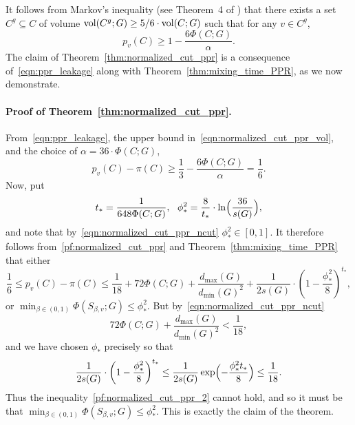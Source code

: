 It follows from Markov's inequality (see Theorem~4 of \cite{andersen2006}) that there exists a set $C^g \subseteq C$ of volume $\mathrm{vol}(C^g;G) \geq 5/6 \cdot \mathrm{vol}(C;G)$ such that for any $v \in C^g$,
\begin{equation}
\label{eqn:ppr_leakage}
p_v(C) \geq 1 - \frac{6\Phi(C;G)}{\alpha}.
\end{equation}
The claim of Theorem~\ref{thm:normalized_cut_ppr} is a consequence of~\eqref{eqn:ppr_leakage} along with Theorem~\ref{thm:mixing_time_PPR}, as we now demonstrate.
\paragraph{Proof of Theorem~\ref{thm:normalized_cut_ppr}.}
	From~\eqref{eqn:ppr_leakage}, the upper bound in~\eqref{eqn:normalized_cut_ppr_vol}, and the choice of $\alpha = 36 \cdot \Phi(C;G)$, 
	\begin{equation}
	\label{pf:normalized_cut_ppr}
	p_v(C) - \pi(C) \geq \frac{1}{3} - \frac{6 \Phi(C;G)}{\alpha} = \frac{1}{6}.
	\end{equation}
	Now, put 
	\begin{equation*}
	t_{\ast} = \frac{1}{648 \Phi(C;G)},~~\phi_{\ast}^2 = \frac{8}{t_{\ast}} \cdot \ln\Bigl(\frac{36}{s(G)}\Bigr),
	\end{equation*}
	and note that by~\eqref{eqn:normalized_cut_ppr_ncut} $\phi_{\ast}^2 \in [0,1]$. It therefore follows from~\eqref{pf:normalized_cut_ppr} and Theorem~\ref{thm:mixing_time_PPR} that either
	\begin{equation}
	\label{pf:normalized_cut_ppr_2}
	\frac{1}{6} \leq p_v(C) - \pi(C) \leq \frac{1}{18} + 72 \Phi(C;G) + \frac{d_{\max}(G)}{d_{\min}(G)^2} + \frac{1}{2s(G)} \cdot \left(1 - \frac{\phi_{\ast}^2}{8}\right)^{t_{\ast}},
	\end{equation}
	or $\min_{\beta \in (0,1)} \Phi(S_{\beta,v};G) \leq \phi_{\ast}^2$. But by~\eqref{eqn:normalized_cut_ppr_ncut}
	\begin{equation*}
	72 \Phi(C;G) + \frac{d_{\max}(G)}{d_{\min}(G)^2} < \frac{1}{18},
	\end{equation*}
	and we have chosen $\phi_{\ast}$ precisely so that
	\begin{equation*}
	\frac{1}{2s(G)} \cdot \left(1 - \frac{\phi_{\ast}^2}{8}\right)^{t_{\ast}} \leq \frac{1}{2s(G)} \exp\Bigl(-\frac{\phi_{\ast}^2 t_{\ast}}{8}\Bigr) \leq \frac{1}{18}.
	\end{equation*}
	Thus the inequality~\eqref{pf:normalized_cut_ppr_2} cannot hold, and so it must be that $\min_{\beta \in (0,1)} \Phi(S_{\beta,v};G) \leq \phi_{\ast}^2$. This is exactly the claim of the theorem.

